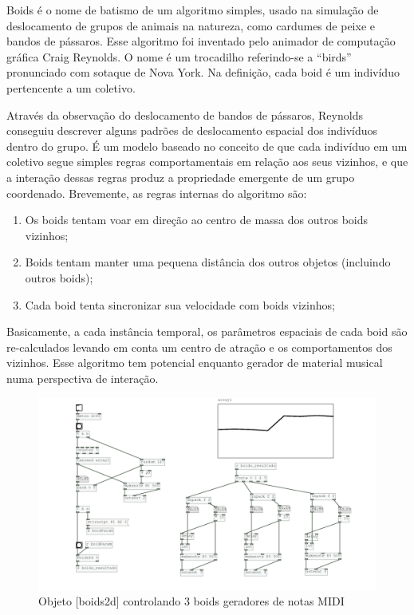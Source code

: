 \documentclass{ppgmus}
\begin{document}
Boids é o nome de batismo de um algoritmo simples, usado na simulação de deslocamento
de grupos de animais na natureza, como cardumes de peixe e bandos de pássaros.
Esse algoritmo foi inventado pelo animador de computação gráfica Craig Reynolds.
O nome é um trocadilho referindo-se a ``birds'' pronunciado com sotaque de Nova York.
Na definição, cada boid é um indivíduo pertencente a um coletivo.

Através da observação do deslocamento de bandos de pássaros, Reynolds conseguiu
descrever alguns padrões de deslocamento espacial dos indivíduos dentro do grupo.
É um modelo baseado no conceito de que cada indivíduo em um coletivo segue simples regras
comportamentais em relação aos seus vizinhos, e que a interação dessas regras
produz a propriedade emergente de um grupo coordenado.
Brevemente, as regras internas do algoritmo são:

\begin{enumerate}
 \item Os boids tentam voar em direção ao centro de massa dos outros boids vizinhos;
 \item Boids tentam manter uma pequena distância dos outros objetos (incluindo outros boids);
 \item Cada boid tenta sincronizar sua velocidade com boids vizinhos; 
\end{enumerate}

Basicamente, a cada instância temporal, os parâmetros espaciais de cada boid são re-calculados
levando em conta um centro de atração e os comportamentos dos vizinhos.
Esse algoritmo tem potencial enquanto gerador de material musical numa perspectiva de interação.

\begin{figure}
\includegraphics[scale=.6]{midi-boid}
\caption{Objeto [boids2d] controlando 3 boids geradores de notas MIDI}
\label{midi-boid}
\end{figure}  
\end{document}
